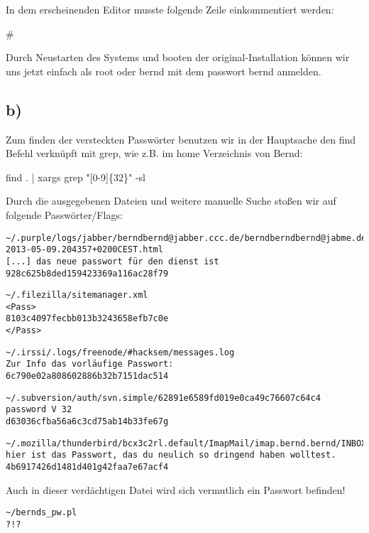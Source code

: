 \documentclass[10pt,a4paper]{article}
\begin{document}
In dem erscheinenden Editor musste folgende Zeile einkommentiert werden:

\# %

Durch Neustarten des Systems und booten der original-Installation können wir uns jetzt einfach als root oder bernd mit dem passwort bernd anmelden.

\subsection*{b)}

Zum finden der versteckten Passwörter benutzen wir in der Hauptsache den find Befehl verknüpft mit grep, wie z.B. im home Verzeichnis von Bernd:

find . | xargs grep "[0-9]\{32\}" -sl

Durch die ausgegebenen Dateien und weitere manuelle Suche stoßen wir auf folgende Passwörter/Flags:

\begin{verbatim}
~/.purple/logs/jabber/berndbernd@jabber.ccc.de/berndberndbernd@jabme.de/
2013-05-09.204357+0200CEST.html
[...] das neue passwort für den dienst ist
928c625b8ded159423369a116ac28f79
\end{verbatim}

\begin{verbatim}
~/.filezilla/sitemanager.xml
<Pass>
8103c4097fecbb013b3243658efb7c0e
</Pass>
\end{verbatim}

\begin{verbatim}
~/.irssi/.logs/freenode/#hacksem/messages.log
Zur Info das vorläufige Passwort:
6c790e02a808602886b32b7151dac514
\end{verbatim}

\begin{verbatim}
~/.subversion/auth/svn.simple/62891e6589fd019e0ca49c76607c64c4
password V 32
d63036cfba56a6c3cd75ab14b33fe67g
\end{verbatim}

\begin{verbatim}
~/.mozilla/thunderbird/bcx3c2rl.default/ImapMail/imap.bernd.bernd/INBOX
hier ist das Passwort, das du neulich so dringend haben wolltest.
4b6917426d1481d401g42faa7e67acf4
\end{verbatim}

Auch in dieser verdächtigen Datei wird sich vermutlich ein Passwort befinden!

\begin{verbatim}
~/bernds_pw.pl
?!?
\end{verbatim}
\end{document}
